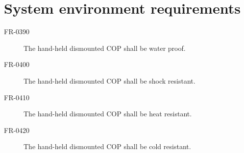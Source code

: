 \section{System environment requirements}

\begin{description}
\item[FR-0390] The hand-held dismounted COP shall be water proof.
\item[FR-0400] The hand-held dismounted COP shall be shock resistant.
\item[FR-0410] The hand-held dismounted COP shall be heat resistant.
\item[FR-0420] The hand-held dismounted COP shall be cold resistant.
\end{description}